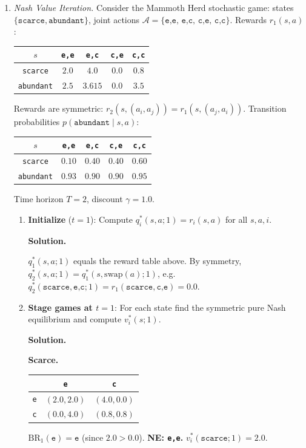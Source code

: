 \documentclass[12pt]{article}
\newenvironment{solution}{%
  \ifshowsolutions\begin{solutionbox}\noindent\textbf{\color{blue!70!black}Solution.}\quad\fi
  \ifshowsolutions\else\expandafter\comment\fi
}{%
  \ifshowsolutions\end{solutionbox}\fi
  \ifshowsolutions\else\expandafter\endcomment\fi
}
\begin{document}
\begin{enumerate}
\item \textit{Nash Value Iteration.}
Consider the Mammoth Herd stochastic game: states $\{\texttt{scarce}, \texttt{abundant}\}$, joint actions $\mathcal{A}=\{\texttt{e,e},\,\texttt{e,c},\,\texttt{c,e},\,\texttt{c,c}\}$. Rewards $r_1(s,a)$:
\begin{table}[H]
  \centering
  \begin{tabular}{|c|c|c|c|c|}
    \hline
    $s$ & \texttt{e,e} & \texttt{e,c} & \texttt{c,e} & \texttt{c,c} \\\hline
    \texttt{scarce}   & $2.0$ & $4.0$ & $0.0$ & $0.8$ \\\hline
    \texttt{abundant} & $2.5$ & $3.615$ & $0.0$ & $3.5$ \\\hline
  \end{tabular}
\end{table}
Rewards are symmetric: $r_2(s,(a_i,a_j))=r_1(s,(a_j,a_i))$. Transition probabilities $p(\texttt{abundant}\mid s,a)$:
\begin{table}[H]
  \centering
  \begin{tabular}{|c|c|c|c|c|}
    \hline
    $s$ & \texttt{e,e} & \texttt{e,c} & \texttt{c,e} & \texttt{c,c} \\\hline
    \texttt{scarce}   & $0.10$ & $0.40$ & $0.40$ & $0.60$ \\\hline
    \texttt{abundant} & $0.93$ & $0.90$ & $0.90$ & $0.95$ \\\hline
  \end{tabular}
\end{table}
Time horizon $T=2$, discount $\gamma=1.0$.

\begin{enumerate}
  \item \textbf{Initialize} ($t=1$): Compute $q_i^*(s,a;1)=r_i(s,a)$ for all $s,a,i$.

  \begin{solution}
    $q_1^*(s,a;1)$ equals the reward table above. By symmetry, $q_2^*(s,a;1)=q_1^*(s,\mathrm{swap}(a);1)$, e.g.\ $q_2^*(\texttt{scarce},\texttt{e,c};1)=r_1(\texttt{scarce},\texttt{c,e})=0.0$.
  \end{solution}

  \item \textbf{Stage games at $t=1$}: For each state find the symmetric pure Nash equilibrium and compute $v_i^*(s;1)$.

  \begin{solution}
    \textbf{Scarce.}
    \begin{center}\begin{tabular}{|c|c|c|}\hline & \texttt{e} & \texttt{c}\\\hline \texttt{e} & $(2.0,2.0)$ & $(4.0,0.0)$\\\hline \texttt{c} & $(0.0,4.0)$ & $(0.8,0.8)$\\\hline\end{tabular}\end{center}
    $\mathrm{BR}_1(\texttt{e})=\texttt{e}$ (since $2.0>0.0$). \textbf{NE: \texttt{e,e}.} $v_i^*(\texttt{scarce};1)=2.0$.


\end{solution}
\end{enumerate}
\end{enumerate}
\end{document}
